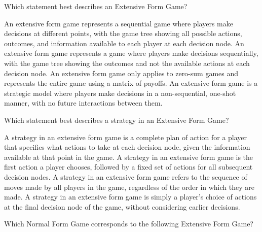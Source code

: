 \documentclass{exam}
\begin{document}
\begin{questions}
        
    \question
    Which statement best describes an Extensive Form Game?

    \begin{checkboxes}
        \choice An extensive form game represents a sequential game where players make decisions at different points, with the game tree showing all possible actions, outcomes, and information available to each player at each decision node.
        \choice An extensive form game represents a game where players make decisions sequentially, with the game tree showing the outcomes and not the available actions at each decision node.            
        \choice An extensive form game only applies to zero-sum games and represents the entire game using a matrix of payoffs.
        \choice An extensive form game is a strategic model where players make decisions in a non-sequential, one-shot manner, with no future interactions between them.
    \end{checkboxes}

    \question Which statement best describes a strategy in an Extensive Form Game?

    \begin{checkboxes}
        \choice A strategy in an extensive form game is a complete plan of action for a player that specifies what actions to take at each decision node, given the information available at that point in the game. 
        \choice A strategy in an extensive form game is the first action a player chooses, followed by a fixed set of actions for all subsequent decision nodes.
        \choice A strategy in an extensive form game refers to the sequence of moves made by all players in the game, regardless of the order in which they are made.
        \choice A strategy in an extensive form game is simply a player's choice of actions at the final decision node of the game, without considering earlier decisions.
    \end{checkboxes}

    \question Which Normal Form Game corresponds to the following Extensive Form
    Game?


\end{questions}
\end{document}
